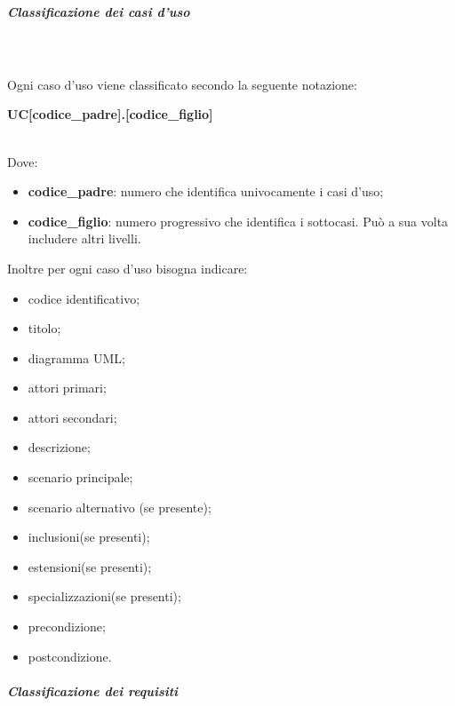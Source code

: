 			\subparagraph{Classificazione dei casi d'uso} \mbox{}\\ \mbox{}\\
			\noindent Ogni caso d'uso viene classificato secondo la seguente notazione: \newline \newline
			\centerline{\textbf{UC[codice\_padre].[codice\_figlio]}} \\
			Dove:
				\begin{itemize}
					\item \textbf{codice\_padre}: numero che identifica univocamente i casi 
						d'uso;
					\item \textbf{codice\_figlio}: numero progressivo che identifica i 
						sottocasi. Può a sua volta includere altri livelli. \\
				\end{itemize}
			Inoltre per ogni caso d'uso bisogna indicare:
				\begin{itemize}
					\item codice identificativo;
					\item titolo;
					\item diagramma UML\glo;
					\item attori primari;
					\item attori secondari;
					\item descrizione;
					\item scenario principale;
					\item scenario alternativo (se presente);
					\item inclusioni(se presenti);
					\item estensioni(se presenti);
					\item specializzazioni(se presenti);
					\item precondizione;
					\item postcondizione. \\
				\end{itemize}
				
			\subparagraph{Classificazione dei requisiti} \mbox{}\\ \label{sec:UC}
			
